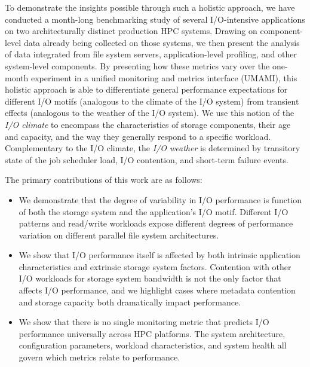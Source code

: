 To demonstrate the insights possible through such a holistic approach, we have conducted a month-long benchmarking study of several I/O-intensive applications on two architecturally distinct production HPC systems.  Drawing on component-level data already being collected on those systems, we then 
present the analysis of data integrated from file system servers, application-level profiling, and other system-level components.
By presenting how these metrics vary over the one-month experiment in a unified monitoring and metrics interface (UMAMI), this holistic approach is able to differentiate general performance expectations for different I/O motifs (analogous to the climate of the I/O system) from transient effects (analogous to the weather of the I/O system).
We use this notion of the \emph{I/O climate} to encompass the characteristics of storage components, their age and capacity, and the way they generally respond to a specific workload.
Complementary to the I/O climate, the \emph{I/O weather} is determined by transitory state of the job scheduler load, I/O contention, and short-term failure events.

The primary contributions of this work are as follows:
\begin{itemize}[leftmargin=*]
\item We demonstrate that the degree of variability in I/O performance is function of both the storage system and the application's I/O motif.
Different I/O patterns and read/write workloads expose different degrees of performance variation on different parallel file system architectures.
\item We show that I/O performance itself is affected by both intrinsic application characteristics and extrinsic storage system factors.
Contention with other I/O workloads for storage system bandwidth is not the only factor that affects I/O performance, and
we highlight cases where metadata contention and storage capacity both dramatically impact performance.
\item We show that there is no single monitoring metric that predicts I/O performance universally across HPC platforms.
The system architecture, configuration parameters, workload characteristics, and system health all govern which metrics relate to performance.
\end{itemize}
